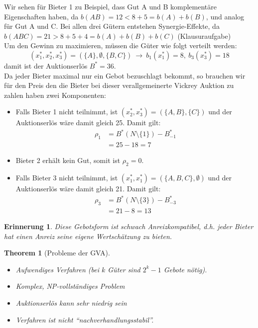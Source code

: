 \documentclass[12pt]{extreport} %
\theoremstyle{named}
\theoremstyle{nnamed}
\newtheorem*{unnamedtheorem*}{Theorem}
\theoremstyle{itshape}
\theoremstyle{normal}
\newtheorem*{erinnerung}{Erinnerung}
\begin{document}
Wir sehen für Bieter 1 zu Beispiel, dass Gut A und B komplementäre Eigenschaften haben, da $b(AB) = 12 < 8 + 5 = b(A) + b(B)$, und analog für Gut A und C. Bei allen drei Gütern entstehen Synergie-Effekte, da $b(ABC) = 21 > 8 + 5+ 4 = b(A) + b(B) + b(C)$ (Klausuraufgabe) ~\\

Um den Gewinn zu maximieren, müssen die Güter wie folgt verteilt werden:
$$ \left( x_1^*, x_2^*, x_3^* \right) = \left( \{ A \}, \emptyset, \{ B, C \} \right) ~ \longrightarrow ~ b_1(x_1^*) = 8,  ~b_3(x_3^*) = 18 $$
damit ist der Auktionserlös $B^{*} = 36$. ~\\


Da jeder Bieter maximal nur ein Gebot bezuschlagt bekommt, so brauchen wir für den Preis den die Bieter bei dieser verallgemeinerte Vickrey Auktion zu zahlen haben zwei Komponenten:

\begin{itemize}
	\item Falls Bieter 1 nicht teilnimmt, ist $\left( x_2^*, x_3^* \right) = \left(\{A, B \}, \{ C \} \right)$ und der Auktionserlös wäre damit gleich 25. Damit gilt:
				\begin{align*}
					\rho_1 & = B^{*} \left(N \setminus \{ 1 \} \right) - B_{-1}^{*} \\
							& = 25 - 18 = 7
				\end{align*}
	\item Bieter 2 erhält kein Gut, somit ist $\rho_2 = 0$.
	\item Falls Bieter 3 nicht teilnimmt, ist $\left( x_1^*, x_1^* \right) = \left(\{A, B, C \}, \emptyset \right)$ und der Auktionserlös wäre damit gleich 21. Damit gilt:
				\begin{align*}
					\rho_3 & = B^{*} \left(N \setminus \{ 3 \} \right) - B_{-3}^{*} \\
							& = 21 - 8 = 13
				\end{align*}			
\end{itemize}

\begin{erinnerung}
	Diese Gebotsform ist schwach Anreizkompatibel, d.h. jeder Bieter hat einen Anreiz seine eigene Wertschätzung zu bieten.
\end{erinnerung} 

\begin{unnamedtheorem*}[Probleme der GVA] ~\ 
	\begin{itemize}
		\item Aufwendiges Verfahren (bei $k$ Güter sind $2^{k} - 1$ Gebote nötig).
		\item Komplex, NP-vollständiges Problem
		\item Auktionserlös kann sehr niedrig sein
		\item Verfahren ist nicht \enquote{nachverhandlungsstabil}.
	\end{itemize}
\end{unnamedtheorem*} ~\\
\end{document}
